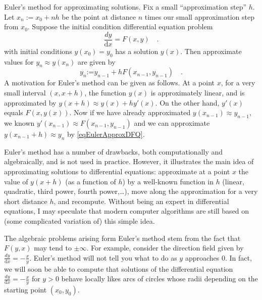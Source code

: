 \documentclass[12pt]{book}
\newcommand{\diff}{\text{d}}
\newcommand{\eqdef}{\textbf{:=}}
\newcommand{\optionalDisplay}[1]{}
\begin{document}
Euler's method for approximating solutions. Fix a small ``approximation step'' $h$. Let $x_n:=x_0+nh$ be the point at distance $n$ times our small approximation step from $x_0$. Suppose the initial condition differential equation problem
\[
\frac{dy}{\diff x}= F(x,y)\quad.  
\]
with initial conditions $y(x_0)=y_0$  has a solution $y(x)$. Then approximate values for $y_n\approx y(x_n)$ are given by
\begin{equation}\label{eqEulerApproxDFQ}
y_n \eqdef y_{n-1} + h F(x_{n-1}, y_{n-1})\quad .
\end{equation}
A motivation for Euler's method can be given as follows. At a point $x$, for a very small interval $(x,x+h)$, the function $y(x)$ is approximately linear, and is approximated by $y(x+h)\approx y(x)+ h y'(x) $. On the other hand, $y'(x)$ equals $F(x, y(x))$. Now if we have already approximated $y(x_{n-1})\approx y_{n-1}$, we known $y'(x_{n-1}) \approx F(x_{n-1}, y_{n-1})$ and  we can approximate $y(x_{n-1}+h)\approx y_n $ by \eqref{eqEulerApproxDFQ}.

Euler's method has a number of drawbacks, both computationally and algebraically, and is not used in practice. However, it illustrates the main idea of approximating solutions to differential equations: approximate at a point $x$ the value of $y(x+h)$ (as a function of $h$) by a well-known function in $h$ (linear, quadratic, third power, fourth power,\dots), move along the approximation for a very short distance $h$, and recompute. Without being an expert in differential equations, I may speculate that modern computer algorithms  are still based on (some complicated variation of) this simple idea.

The algebraic problems arising form Euler's method stem from the fact that $F(y,x)$ may tend to $\pm\infty$. For example, consider the direction field given by $\frac{dy}{\diff x}= -\frac{x}{y}$. Euler's method will not tell you what to do as $y$ approaches $0$. In fact, we will soon be able to compute that solutions of the differential equation  $\frac{dy}{\diff x}= -\frac{x}{y}$ for $y>0$ behave locally likes arcs of circles whose radii depending on the starting point $(x_0, y_0)$.

\optionalDisplay{
\begin{pspicture}(-6,-1)(6,6)
\psaxes{<->}(0,0)(-6,-1)(6,6)
\rput (5,5){The direction field $\frac{dy}{\diff x}=-\frac{x}{y}$}
  \psset{arrows=->}
  \multido{\ra=-4+0.5}{17}{%
    \multido{\rb=0.001+0.5}{8}{%
      \pstVerb{/xC \ra\space def
               /yC \rb\space def
               /F  xC yC div -1 mul \space def
}
\psdot[linecolor=red!60](! xC yC)
\psline[linecolor=blue](! xC F ATAN 57.295 mul cos 0.2 mul sub yC F ATAN 57.295 mul sin 0.2 mul sub)(! xC F ATAN 57.295 mul cos 0.2 mul add yC F ATAN 57.295 mul sin 0.2 mul add )
}}
\end{pspicture}
} %
\end{document}
